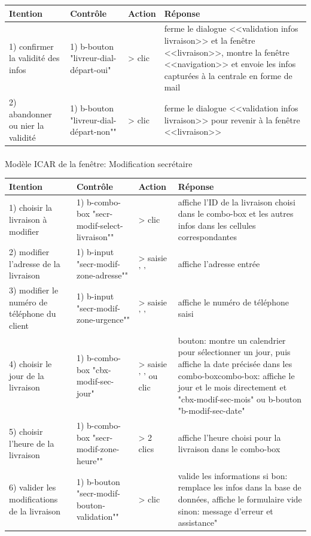 \documentclass{report}
\begin{document}
\begin{longtable}{|p{3cm}|p{4cm}|p{2cm}|p{5cm}|}
\hline
Itention&Contrôle&Action&Réponse\\\hline
1) confirmer la validité des infos&1) b-bouton \newline
"livreur-dial-départ-oui"&> clic&ferme le dialogue <<validation infos livraison>> et la fenêtre <<livraison>>, montre la fenêtre <<navigation>> et envoie les infos capturées à la centrale en forme de mail\\\hline
2) abandonner ou nier la validité&1) b-bouton \newline
"livreur-dial-départ-non""&> clic&ferme le dialogue <<validation infos livraison>> pour revenir à la fenêtre <<livraison>>\\\hline
\end{longtable}

\paragraph{}
Modèle ICAR de la fenêtre: Modification secrétaire

\begin{longtable}{|p{3cm}|p{4cm}|p{2cm}|p{5cm}|}
\hline
Itention&Contrôle&Action&Réponse\\\hline
1) choisir la livraison à modifier&1) b-combo-box\newline
"secr-modif-select-livraison""&> clic&affiche l'ID de la livraison choisi dans le combo-box et les autres infos dans les cellules correspondantes\\\hline
2) modifier l'adresse de la livraison&1) b-input \newline
"secr-modif-zone-adresse""&> saisie ' '&affiche l'adresse entrée\\\hline
3) modifier le numéro de téléphone du client&1) b-input \newline
"secr-modif-zone-urgence""&> saisie ' '&affiche le numéro de téléphone saisi\\\hline
4) choisir le jour de la livraison&1) b-combo-box\newline
"cbx-modif-sec-jour"&> saisie ' ' ou clic&bouton: montre un calendrier pour sélectionner un jour, puis affiche la date précisée dans les combo-box\newline combo-box: affiche le jour et le mois directement et "cbx-modif-sec-mois" ou b-bouton "b-modif-sec-date"\\\hline
5) choisir l'heure de la livraison&1) b-combo-box\newline
"secr-modif-zone-heure""&> 2 clics&affiche l'heure choisi pour la livraison dans le combo-box\\\hline
6) valider les modifications de la livraison&1) b-bouton \newline
"secr-modif-bouton-validation""&> clic&valide les informations\newline
si bon: remplace les infos dans la base de données, affiche le formulaire vide\newline
sinon: message d'erreur et assistance"\\\hline
\end{longtable}
\end{document}
